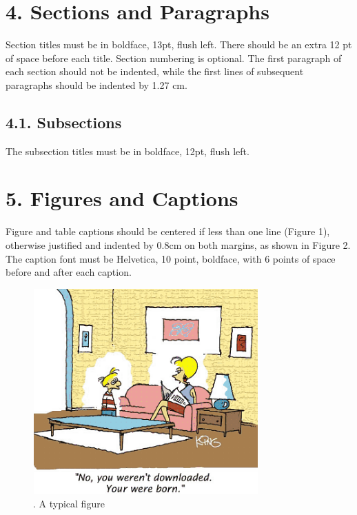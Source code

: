 \documentclass[12pt]{article}
\begin{document}
\section*{4. Sections and Paragraphs}
Section titles must be in boldface, 13pt, flush left. There should be an extra 12 pt of space before each title. Section numbering is optional. The first paragraph of each section should not be indented, while the first lines of subsequent paragraphs should be indented by 1.27 cm. \par

\subsection*{4.1. Subsections}
The subsection titles must be in boldface, 12pt, flush left.\par

\section*{5. Figures and Captions}
Figure and table captions should be centered if less than one line (Figure 1), otherwise justified and indented by 0.8cm on both margins, as shown in Figure 2. The caption font must be Helvetica, 10 point, boldface, with 6 points of space before and after each caption. \par




\begin{figure}[H]
	\begin{Center}
		\includegraphics[width=245.25pt,height=223.5pt]{./media/image1.png}
		\caption{. A typical figure}
		\label{fig:. A typical figure}
	\end{Center}
\end{figure}
\end{document}
